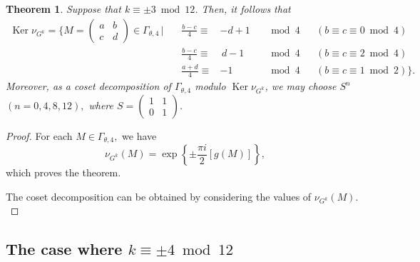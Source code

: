 \documentclass[12pt]{article}
\theoremstyle{definition}
\newtheorem{theorem}{Theorem}
\numberwithin{equation}{section}
\numberwithin{theorem}{section}
\newcommand{\Ker}{\operatorname{Ker}}
\begin{document}
\begin{theorem}
\label{thmk=3-level4}
{\it
Suppose that 
$k\equiv \pm 3 \bmod{12}$. 
Then, it follows that 
\begin{align*}
\Ker \nu_{G^{k}}
=
\Big\{
M=
\begin{pmatrix}
a & b \\
c & d
\end{pmatrix}
\in
\Gamma_{\theta,4} \,\Big| \, 
&  &\frac{b-c}{4} \equiv& -d+1  & &\bmod{4}  &  &(b\equiv c \equiv  0\bmod{4})   \\
&  &\frac{b-c}{4} \equiv& \, d-1 & &\bmod{4}  &  &(b\equiv c \equiv  2\bmod{4})   \\
&  &\frac{a+d}{4}\equiv& -1 &  &\bmod{4} & &(b\equiv c\equiv 1 \bmod{2})   
\Big\}.
\end{align*}
Moreover, 
as a coset decomposition of $\Gamma_{\theta,4}$ modulo $\Ker \nu_{G^{k}}$,  
we may choose $S^{n}$ $(n=0,4,8,12),$ where 
$
S=
\begin{pmatrix}
1 & 1 \\
0 & 1
\end{pmatrix}. 
$
}
\end{theorem}




\begin{proof}
For each $M\in\Gamma_{\theta,4},$ 
we have 
\begin{equation*}
\nu_{G^k}(M)=
\exp
\left\{
\pm
\frac{\pi i}{2}
\left[
g(M)
\right]
\right\},
\end{equation*}
which proves the theorem. 
\par
The coset decomposition can be obtained by considering the values of $\nu_{G^{k}  }(M).$
\end{proof}

















\subsection{The case where $k\equiv \pm 4 \bmod{12}$}
\end{document}

